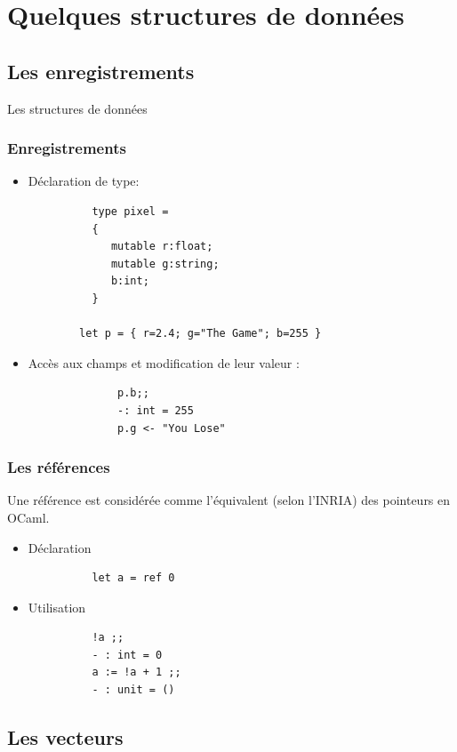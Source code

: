 
\section{Quelques structures de données}
\subsection{Les enregistrements}

\begin{frame}
	\begin{center}
		\huge
		Les structures de données
	\end{center}
\end{frame}


\begin{frame}[fragile]
	\frametitle{Enregistrements}
	\begin{itemize}
	\item Déclaration de type:
		\begin{lstlisting}
		  type pixel =
		  {
		     mutable r:float;
		     mutable g:string;
		     b:int;
		  }
		
		let p = { r=2.4; g="The Game"; b=255 }
		\end{lstlisting}
	\item Accès aux champs et modification de leur valeur :
		\begin{lstlisting}
			  p.b;;
			  -: int = 255
			  p.g <- "You Lose"
		\end{lstlisting}
	\end{itemize}
\end{frame}


\begin{frame}[fragile]
	\frametitle{Les références}
	Une référence est considérée comme l'équivalent (selon l'INRIA) des pointeurs en OCaml.\\
	\begin{itemize}
	\item Déclaration
		\begin{lstlisting}
		  let a = ref 0
		\end{lstlisting}
	\item Utilisation
		\begin{lstlisting}
		  !a ;;
		  - : int = 0
		  a := !a + 1 ;;
		  - : unit = ()
		\end{lstlisting}
	\end{itemize}

\end{frame}

\subsection{Les vecteurs}

